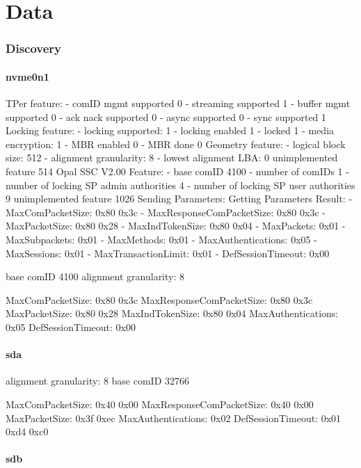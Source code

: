 \documentclass[
  digital, %
  oneside, %
  nolof,     %
  nolot,     %
]{fithesis4}
\begin{document}
\chapter{Data}

\subsection{Discovery}


\subsubsection{nvme0n1}

TPer feature:
 - comID mgmt supported 0
 - streaming supported 1
 - buffer mgmt supported 0
 - ack nack supported 0
 - async supported 0
 - sync supported 1
Locking feature:
 - locking supported: 1
 - locking enabled 1
 - locked 1
 - media encryption: 1
 - MBR enabled 0
 - MBR done 0
Geometry feature:
 - logical block size: 512
 - alignment granularity: 8
 - lowest alignment LBA: 0
unimplemented feature 514
Opal SSC V2.00 Feature:
 - base comID 4100
 - number of comIDs 1
 - number of locking SP admin authorities 4
 - number of locking SP user authorities 9
unimplemented feature 1026
Sending Parameters:
Getting Parameters Result:
 - MaxComPacketSize: 0x80 0x3c
 - MaxResponseComPacketSize: 0x80 0x3c
 - MaxPacketSize: 0x80 0x28
 - MaxIndTokenSize: 0x80 0x04
 - MaxPackets: 0x01
 - MaxSubpackets: 0x01
 - MaxMethods: 0x01
 - MaxAuthentications: 0x05
 - MaxSessions: 0x01
 - MaxTransactionLimit: 0x01
 - DefSessionTimeout: 0x00



base comID 4100
alignment granularity: 8

MaxComPacketSize: 0x80 0x3c
MaxResponseComPacketSize: 0x80 0x3c
MaxPacketSize: 0x80 0x28
MaxIndTokenSize: 0x80 0x04
MaxAuthentications: 0x05
DefSessionTimeout: 0x00

\subsubsection{sda}

alignment granularity: 8
base comID 32766

MaxComPacketSize: 0x40 0x00
MaxResponseComPacketSize: 0x40 0x00
MaxPacketSize: 0x3f 0xec
MaxAuthentications: 0x02
DefSessionTimeout: 0x01 0xd4 0xc0

\subsubsection{sdb}
\end{document}
